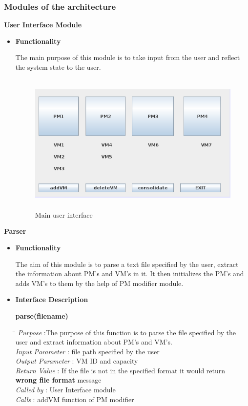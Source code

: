 \documentclass[a4paper,11pt]{article}
\begin{document}
\subsubsection{Modules of the architecture }
\textbf{User Interface Module}
\begin{itemize}
 \item \textbf{Functionality}
 
 The main purpose of this module is to take input from the user and reflect the system state to the user. 
 \begin{figure}[h]
\centering
\includegraphics[height=7cm]{images/GUI.png}
\caption{Main user interface}
\label{fig:GUI}

\end{figure}
\end{itemize}
\textbf{Parser}
\begin{itemize}
\item \textbf{Functionality}

The aim of this module is to parse a text file specified by the user, extract the information about PM's and VM's in it.
It then initializes the PM's and adds VM's to them by the help of PM modifier module.

\item \textbf{Interface Description} 

\textbf{parse(filename)}
  
\begin{tabbing}
\hspace*{4cm}\=  \kill
 \textit{Purpose} \> :The purpose of this function is to parse the file specified by the \\ \>user and extract information about PM's and VM's.\\
  \textit{Input Parameter} \> : file path specified by the user \\
  \textit{Output Parameter} \> : VM ID and capacity \\
  \textit{Return Value} \> : If the file is not in the specified format it would return \\ \>\textbf{wrong file format} message \\
  \textit{Called by} \> : User Interface module \\
  \textit{Calls} \> : addVM function of PM modifier
\end{tabbing}
\end{itemize}
\end{document}

